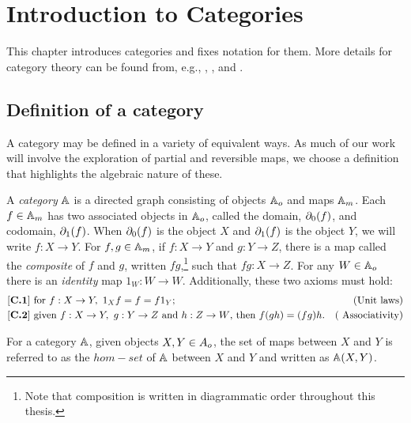
\chapter{Introduction to Categories}\label{chap:introduction_to_categories}

This chapter introduces categories and fixes notation for them. More
details for category theory can be found from, e.g., \cite{barr:ctcs}, \cite{cockett2009:ctcs},
\cite{maclan97:categorieswrkmath} and \cite{various:nlab}.

\section{Definition of a category}
\label{sec:definition_of_a_category}


A category may be defined in a variety of equivalent ways. As much of our work will involve the
exploration of partial and reversible maps, we choose a definition that highlights the algebraic
nature of these.

\begin{definition}\label{def:category}
  A \emph{category} $\mathbb{A}$ is a directed graph consisting of objects ${\mathbb{A}}_o$ and maps ${\mathbb{A}}_m$. Each $f\in
  {\ensuremath{\mathbb{A}}}_m$ has two associated objects in ${\mathbb{A}}_o$, called the domain, $\partial_0({f})$, and codomain,
  $\partial_1({f})$. When $\partial_0({f})$ is the object $X$  and $\partial_1({f})$ is the object $Y$, we
  will write $f:X \to Y$. For $f, g \in \mathbb{A}_m$, if $f:X\to Y$ and $g:Y \to Z$, there is a map called
  the \emph{composite} of $f$ and $g$, written $f g$,\footnote{Note that composition is written in
    diagrammatic order throughout this thesis.} such that $f g:X \to Z$. For any $W \in \mathbb{A}_o$ there is
  an \emph{identity} map $1_W:W \to W$. Additionally, these two axioms must hold:
  \begin{align*}
    \catone &\text{ for }f:X \to Y,\ 1_X f = f = f 1_Y;&\text{(Unit laws)}\\
    \cattwo &\text{ given }f:X \to Y,\ g:Y \to Z\text{ and }h: Z\to W\text{, then }f (g h) = (f g) h.&\text{( Associativity)}
  \end{align*}
\end{definition}

For a category $\mathbb{A}$, given objects $X,Y\in{A}_o$, the set of maps between $X$ and $Y$ is
referred to as the $hom-set$ of $\mathbb{A}$ between $X$ and $Y$ and written as $\mathbb{A}(X,Y)$.

